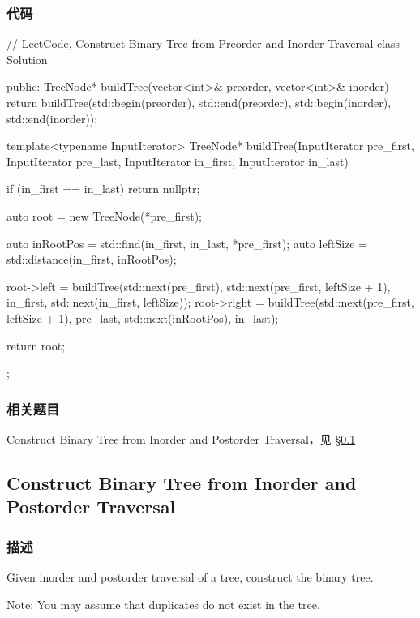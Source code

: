 \subsubsection{代码}
\begin{Code}
// LeetCode, Construct Binary Tree from Preorder and Inorder Traversal
class Solution {
public:
    TreeNode* buildTree(vector<int>& preorder, vector<int>& inorder) {
        return buildTree(std::begin(preorder), std::end(preorder),
                std::begin(inorder), std::end(inorder));
    }

    template<typename InputIterator>
    TreeNode* buildTree(InputIterator pre_first, InputIterator pre_last,
            InputIterator in_first, InputIterator in_last) {
        if (in_first == in_last) return nullptr;

        auto root = new TreeNode(*pre_first);

        auto inRootPos = std::find(in_first, in_last, *pre_first);
        auto leftSize = std::distance(in_first, inRootPos);

        root->left = buildTree(std::next(pre_first), std::next(pre_first,
                leftSize + 1), in_first, std::next(in_first, leftSize));
        root->right = buildTree(std::next(pre_first, leftSize + 1), pre_last,
                std::next(inRootPos), in_last);

        return root;
    }
};
\end{Code}


\subsubsection{相关题目}
\begindot
\item Construct Binary Tree from Inorder and Postorder Traversal，见 \S \ref{sec:construct-binary-tree-from-inorder-and-postorder-traversal}
\myenddot


\subsection{Construct Binary Tree from Inorder and Postorder Traversal}
\label{sec:construct-binary-tree-from-inorder-and-postorder-traversal}


\subsubsection{描述}
Given inorder and postorder traversal of a tree, construct the binary tree.

Note:
You may assume that duplicates do not exist in the tree.


